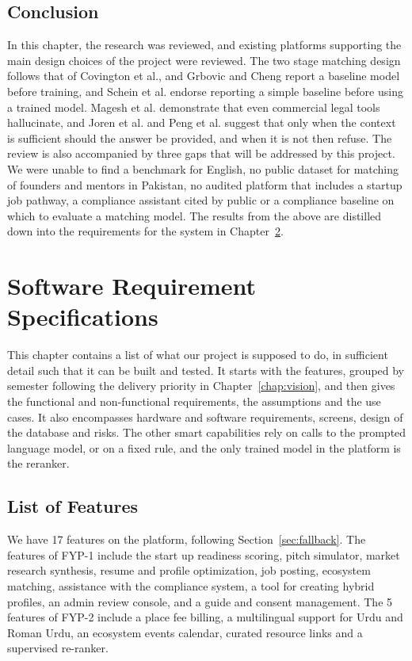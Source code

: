 \documentclass{FastFyp}
\begin{document}
\FloatBarrier

\section{Conclusion}
In this chapter, the research was reviewed, and existing platforms supporting the main design choices of the project were reviewed. The two stage matching design follows that of Covington et al., and Grbovic and Cheng report a baseline model before training, and Schein et al. endorse reporting a simple baseline before using a trained model. Magesh et al. demonstrate that even commercial legal tools hallucinate, and Joren et al. and Peng et al. suggest that only when the context is sufficient should the answer be provided, and when it is not then refuse. The review is also accompanied by three gaps that will be addressed by this project. We were unable to find a benchmark for English, no public dataset for matching of founders and mentors in Pakistan, no audited platform that includes a startup job pathway, a compliance assistant cited by public or a compliance baseline on which to evaluate a matching model. The results from the above are distilled down into the requirements for the system in Chapter~\ref{chap:software-requirements}.

\chapter{Software Requirement Specifications}\label{chap:software-requirements}
This chapter contains a list of what our project is supposed to do, in sufficient detail such that it can be built and tested. It starts with the features, grouped by semester following the delivery priority in Chapter~\ref{chap:vision}, and then gives the functional and non-functional requirements, the assumptions and the use cases. It also encompasses hardware and software requirements, screens, design of the database and risks. The other smart capabilities rely on calls to the prompted language model, or on a fixed rule, and the only trained model in the platform is the reranker.

\section{List of Features}
We have 17 features on the platform, following Section~\ref{sec:fallback}. The features of FYP-1 include the start up readiness scoring, pitch simulator, market research synthesis, resume and profile optimization, job posting, ecosystem matching, assistance with the compliance system, a tool for creating hybrid profiles, an admin review console, and a guide and consent management. The 5 features of FYP-2 include a place fee billing, a multilingual support for Urdu and Roman Urdu, an ecosystem events calendar, curated resource links and a supervised re-ranker.
\end{document}
